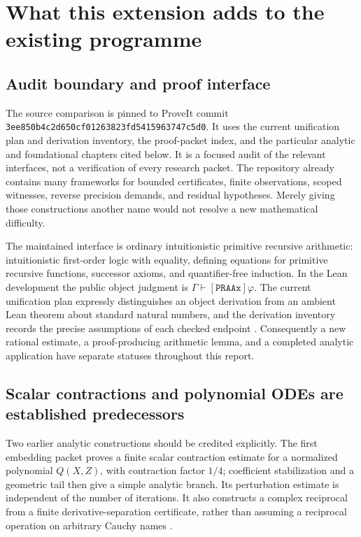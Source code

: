 \section{What this extension adds to the existing programme}
\label{sec:source-audit}

\subsection{Audit boundary and proof interface}

The source comparison is pinned to ProveIt commit
\nolinkurl{3ee850b4c2d650cf01263823fd5415963747c5d0}.
It uses the current unification plan and derivation inventory, the proof-packet
index, and the particular analytic and foundational chapters cited below.
It is a focused audit of the relevant interfaces, not a verification of every
research packet. The repository already contains many frameworks for bounded
certificates, finite observations, scoped witnesses, reverse precision
demands, and residual hypotheses. Merely giving those constructions another
name would not resolve a new mathematical difficulty.

The maintained interface is ordinary intuitionistic primitive recursive
arithmetic: intuitionistic first-order logic with equality, defining equations
for primitive recursive functions, successor axioms, and quantifier-free
induction. In the Lean development the public object judgment is
\(\Gamma\vdash[\texttt{PRAAx}]\varphi\).
The current unification plan expressly distinguishes an object derivation
from an ambient Lean theorem about standard natural numbers, and the
derivation inventory records the precise assumptions of each checked
endpoint \cite{audit-unification,audit-progress}.
Consequently a new rational estimate, a proof-producing arithmetic lemma,
and a completed analytic application have separate statuses throughout this
report.

\subsection{Scalar contractions and polynomial ODEs are established predecessors}

Two earlier analytic constructions should be credited explicitly.
The first embedding packet proves a finite scalar contraction estimate for
a normalized polynomial \(Q(X,Z)\), with contraction factor \(1/4\);
coefficient stabilization and a geometric tail then give a simple analytic
branch. Its perturbation estimate is independent of the number of iterations.
It also constructs a complex reciprocal from a finite derivative-separation
certificate, rather than assuming a reciprocal operation on arbitrary
Cauchy names \cite{audit-scalar}.

